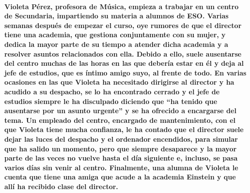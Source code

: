 \paragraph{Violeta Pérez, profesora de Música, empieza a trabajar en un centro de Secundaria, impartiendo su materia a
alumnos de ESO. Varias semanas después de empezar el curso, oye rumores de que el director tiene una
academia, que gestiona conjuntamente con su mujer, y dedica la mayor parte de su tiempo a atender dicha
academia y a resolver asuntos relacionados con ella. Debido a ello, suele ausentarse del centro muchas de las
horas en las que debería estar en él y deja al jefe de estudios, que es íntimo amigo suyo, al frente de todo.
En varias ocasiones en las que Violeta ha necesitado dirigirse al director y ha acudido a su despacho, se lo ha
encontrado cerrado y el jefe de estudios siempre le ha disculpado diciendo que “ha tenido que ausentarse por
un asunto urgente” y se ha ofrecido a encargarse del tema.
Un empleado del centro, encargado de mantenimiento, con el que Violeta tiene mucha confianza, le ha
contado que el director suele dejar las luces del despacho y el ordenador encendidos, para simular que ha
salido un momento, pero que siempre desaparece y la mayor parte de las veces no vuelve hasta el día siguiente
e, incluso, se pasa varios días sin venir al centro.
Finalmente, una alumna de Violeta le cuenta que tiene una amiga que acude a la academia Einstein y que allí
ha recibido clase del director.}

